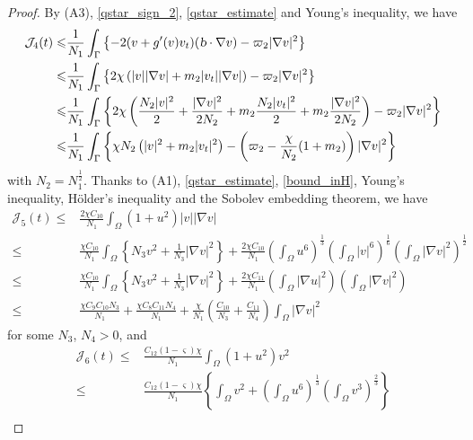 \documentclass{elsarticle}
\begin{document}
\begin{proof}
By (A3), \eqref{qstar_sign_2}, \eqref{qstar_estimate} and Young's inequality, we have
\begin{equation*}
\begin{split}
\mathcal{J}_4(t)\leqslant&\frac{1}{N_1}\int_{\Gamma}\left\{-2( v + g^{\prime}(v)v_t)(\textsl{b}\cdot\nabla v) - \varpi_2|\nabla v|^2\right\}\\
\leqslant&\frac{1}{N_1}\int_{\Gamma}\left\{2\chi\left( |v||\nabla v| + m_{2}|v_t||\nabla v| \right)- \varpi_2|\nabla v|^2\right\}\\
\leqslant&\frac{1}{N_1}\int_{\Gamma}\left\{2\chi\left( \frac{N_2|v|^2}{2}+\frac{|\nabla v|^2}{2N_2} + m_{2}\frac{N_2|v_t|^2}{2}+m_{2}\frac{|\nabla v|^2}{2N_2} \right)- \varpi_2|\nabla v|^2\right\}\\
\leqslant&\frac{1}{N_1}\int_{\Gamma}\left\{\chi N_2\left( |v|^2+ m_{2}|v_t|^2 \right)- \left(\varpi_2 -\frac{\chi}{N_2}(1+m_2) \right)|\nabla v|^2\right\}
\end{split}
\end{equation*}
with $N_2=N_1^{\frac{1}{2}}$.
Thanks to (A1), \eqref{qstar_estimate}, \eqref{bound_inH}, Young's inequality, H\"older's inequality and the Sobolev embedding theorem, we have
\begin{equation*}
\begin{split}
\mathcal{J}_5(t)\leqslant& \frac{2\chi C_{10}}{N_1}\int_{\Omega}(1+u^2)|v||\nabla v|\\
\leqslant& \frac{\chi C_{10}}{N_1}\int_{\Omega}\left\{N_3v^2 + \frac{1}{N_3}|\nabla v|^2\right\} +\frac{2\chi C_{10}}{N_1}\left(\int_{\Omega}u^6\right)^{\frac{1}{3}}\left(\int_{\Omega}|v|^6\right)^{\frac{1}{6}}\left(\int_{\Omega}|\nabla v|^2\right)^{\frac{1}{2}}\\
\leqslant& \frac{\chi C_{10}}{N_1}\int_{\Omega}\left\{N_3v^2 + \frac{1}{N_3}|\nabla v|^2\right\} +\frac{2\chi C_{11}}{N_1}\left(\int_{\Omega}|\nabla u|^2\right)\left(\int_{\Omega}|\nabla v|^2\right)\\
\leqslant& \frac{\chi C_9 C_{10} N_3}{N_1} +\frac{\chi C_8 C_{11} N_4}{N_1} + \frac{\chi}{N_1}\left(\frac{C_{10}}{N_3}+\frac{C_{11}}{N_4}\right)\int_{\Omega}|\nabla v|^2
\end{split}
\end{equation*}
for some $N_3$, $N_4>0$,
and
\begin{equation*}
\begin{split}
\mathcal{J}_6(t)\leqslant & \frac{C_{12}(1-\varsigma)\chi }{N_1}\int_{\Omega}(1+u^2)v^2\\
\leqslant&\frac{ C_{12}(1-\varsigma)\chi}{N_1}\left\{\int_{\Omega}v^2+ \left(\int_{\Omega}u^6\right)^{\frac{1}{3}}\left(\int_{\Omega}v^3\right)^{\frac{2}{3}}\right\}\\

\end{split}
\end{equation*}
\end{proof}
\end{document}
